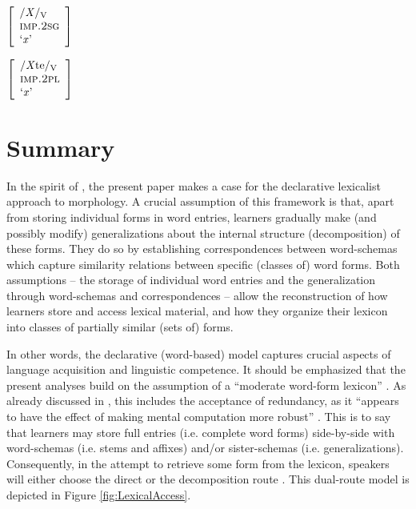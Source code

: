 \documentclass[output=paper,colorlinks,citecolor=brown,
]{langscibook}
\begin{document}
\bigskip

\begin{minipage}[t]{0.26\textwidth}
\ea\label{ex:ruleIMP_2PL}
$\left[
\begin{array}{l}
    \text{/\textit{X}/\textsubscript{V}} \\
    \textsc{imp.2sg} \\
    \text{`\textit{x}'}
\end{array}
\right] $ 
\z
\end{minipage}%
\begin{minipage}[t]{0.45\textwidth}
\begin{exe}
\exi{$\longleftrightarrow$}
$\left[
\begin{array}{l}
    \text{/\textit{X}te/\textsubscript{V}} \\
    \textsc{imp.2pl} \\
    \text{`\textit{x}'}
\end{array}
\right] $
\end{exe}
\end{minipage}


\section{Summary}\label{sec:Summary}

In the spirit of \citet{Zimmermann2019}, the present paper makes a case for the declarative lexicalist approach to morphology. A crucial assumption of this framework is that, apart from storing individual forms in word entries, learners gradually make (and possibly modify) generalizations about the internal structure (decomposition) of these forms. They do so by establishing correspondences between word-schemas which capture similarity relations between specific (classes of) word forms. Both assumptions -- the storage of individual word entries and the generalization through word-schemas and correspondences -- allow the reconstruction of how learners store and access lexical material, and how they organize their lexicon into classes of partially similar (sets of) forms. 

In other words, the declarative (word-based) model captures crucial aspects of language acquisition and linguistic competence. It should be emphasized that the present analyses build on the assumption of a ``moderate word-form lexicon'' \citep[see][70--74]{HaspelmathSims2010}. As already discussed in , this includes the acceptance of redundancy, as it ``appears to have the effect of making mental computation more robust'' \citep[6]{Libben2007}. This is to say that learners may store full entries (i.e. complete word forms) side-by-side with word-schemas (i.e. stems and affixes) and/or sister-schemas (i.e. generalizations). Consequently, in the attempt to retrieve some form from the lexicon, speakers will either choose the direct or the decomposition route \citep[see][72]{HaspelmathSims2010}. This dual-route model is depicted in Figure \ref{fig:LexicalAccess}.
\end{document}
